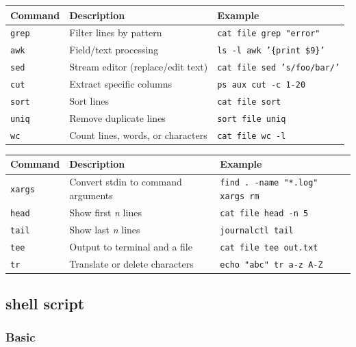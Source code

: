 \documentclass[paper=8.5in:11in, twoside, 12pt, pagesize=pdftex]{book}
\begin{document}
\begin{tabular}{|l|p{8cm}|l|}
	\hline	
\textbf{Command} & \textbf{Description} & \textbf{Example} \\ \hline
\texttt{grep}    & Filter lines by pattern                & \texttt{cat file \textbar{} grep "error"} \\ \hline
\texttt{awk}     & Field/text processing                  & \texttt{ls -l \textbar{} awk '\{print \$9\}'} \\ \hline
\texttt{sed}     & Stream editor (replace/edit text)      & \texttt{cat file \textbar{} sed 's/foo/bar/'} \\ \hline
\texttt{cut}     & Extract specific columns               & \texttt{ps aux \textbar{} cut -c 1-20} \\ \hline
\texttt{sort}    & Sort lines                             & \texttt{cat file \textbar{} sort} \\ \hline
\texttt{uniq}    & Remove duplicate lines                 & \texttt{sort file \textbar{} uniq} \\ \hline
\texttt{wc}      & Count lines, words, or characters      & \texttt{cat file \textbar{} wc -l} \\ \hline
\end{tabular}	

\begin{tabular}{|l|p{6.5cm}|l|}
	\hline
	\textbf{Command} & \textbf{Description} & \textbf{Example} \\ \hline
	\texttt{xargs}   & Convert stdin to command arguments     & \texttt{find . -name "*.log" \textbar{} xargs rm} \\ \hline
	\texttt{head}    & Show first \textit{n} lines            & \texttt{cat file \textbar{} head -n 5} \\ \hline
	\texttt{tail}    & Show last \textit{n} lines             & \texttt{journalctl \textbar{} tail} \\ \hline
	\texttt{tee}     & Output to terminal and a file          & \texttt{cat file \textbar{} tee out.txt} \\ \hline
	\texttt{tr}      & Translate or delete characters         & \texttt{echo "abc" \textbar{} tr a-z A-Z} \\ \hline
\end{tabular}

\subsection{shell script}
\subsubsection{Basic}
\end{document}
